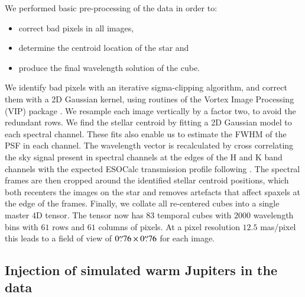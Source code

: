 \documentclass{aa}
\begin{document}
We performed basic pre-processing of the data in order to:
\begin{itemize}
    \item correct bad pixels in all images,
    \item determine the centroid location of the star and
    \item produce the final wavelength solution of the cube. 
\end{itemize}
We identify bad pixels with an iterative sigma-clipping algorithm, and correct them with a 2D Gaussian kernel, using routines of the Vortex Image Processing (\textsc{VIP}) package \citep{2017AJGomezVIP,2023Christiaens}.
We resample each image vertically by a factor two, to avoid the redundant rows. 
We find the stellar centroid by fitting a 2D Gaussian model to each spectral channel. 
These fits also enable us to estimate the FWHM of the PSF in each channel. 
The wavelength vector is recalculated by cross correlating the sky signal present in spectral channels at the edges of the H and K band channels with the expected ESOCalc transmission profile following \cite{2018AHoeijmakersMM}. 
The spectral frames are then cropped around the identified stellar centroid positions, which both recenters the images on the star and removes artefacts that affect spaxels at the edge of the frames.
Finally, we collate all re-centered cubes into a single master 4D tensor.
The tensor now has $83$ temporal cubes with $2000$ wavelength bins with $61$ rows and $61$ columns of pixels.
At a pixel resolution $12.5$ mas/pixel this leads to a field of view of $0\overset{\prime\prime}{.}76 \times 0\overset{\prime\prime}{.}76$ for each image.

\subsection{Injection of simulated warm Jupiters in the data}\label{sec: FC insertion}
\end{document}
